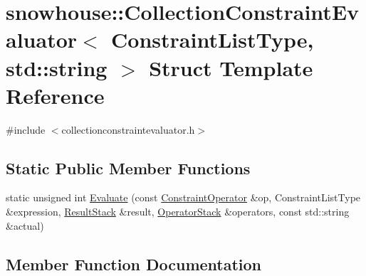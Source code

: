 \hypertarget{structsnowhouse_1_1CollectionConstraintEvaluator_3_01ConstraintListType_00_01std_1_1string_01_4}{}\section{snowhouse\+::Collection\+Constraint\+Evaluator$<$ Constraint\+List\+Type, std\+::string $>$ Struct Template Reference}
\label{structsnowhouse_1_1CollectionConstraintEvaluator_3_01ConstraintListType_00_01std_1_1string_01_4}


{\ttfamily \#include $<$collectionconstraintevaluator.\+h$>$}

\subsection*{Static Public Member Functions}
\begin{DoxyCompactItemize}
\item 
static unsigned int \mbox{\hyperlink{structsnowhouse_1_1CollectionConstraintEvaluator_3_01ConstraintListType_00_01std_1_1string_01_4_aa527123d6aafff68ee0da571d194c59a}{Evaluate}} (const \mbox{\hyperlink{structsnowhouse_1_1ConstraintOperator}{Constraint\+Operator}} \&op, Constraint\+List\+Type \&expression, \mbox{\hyperlink{namespacesnowhouse_a719169b1315a13161c15f25e600a8f51}{Result\+Stack}} \&result, \mbox{\hyperlink{namespacesnowhouse_adcb10e215e6a4bbcb35722a9c7270fc6}{Operator\+Stack}} \&operators, const std\+::string \&actual)
\end{DoxyCompactItemize}


\subsection{Member Function Documentation}
\mbox{\label{structsnowhouse_1_1CollectionConstraintEvaluator_3_01ConstraintListType_00_01std_1_1string_01_4_aa527123d6aafff68ee0da571d194c59a}} 
